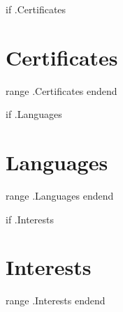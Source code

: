 \documentclass[10pt,a4paper,sans]{moderncv}
\begin{document}
{{if .Certificates }}\section{Certificates}
{{range .Certificates }}
{{end}}{{end}}

{{if .Languages}}\section{Languages}
{{range .Languages}}
{{end}}{{end}}

{{if .Interests}}\section{Interests}
{{range .Interests}}
{{end}}{{end}}
\end{document}
